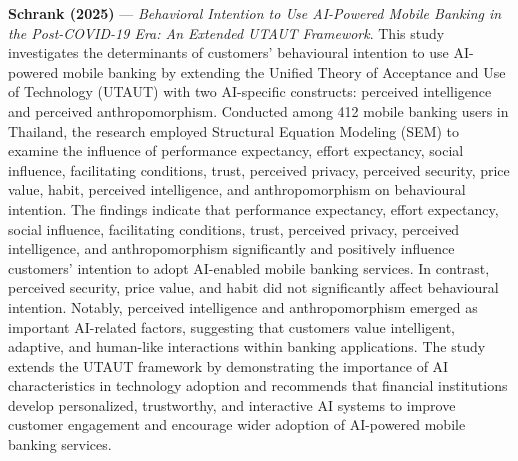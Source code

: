\documentclass[conference]{IEEEtran}
\begin{document}
\noindent\textbf{Schrank (2025)}\nocite{Manta2025} --- \emph{Behavioral Intention to Use AI-Powered Mobile Banking in the Post-COVID-19 Era: An Extended UTAUT Framework}. This study investigates the determinants of customers' behavioural intention to use AI-powered mobile banking by extending the Unified Theory of Acceptance and Use of Technology (UTAUT) with two AI-specific constructs: perceived intelligence and perceived anthropomorphism. Conducted among 412 mobile banking users in Thailand, the research employed Structural Equation Modeling (SEM) to examine the influence of performance expectancy, effort expectancy, social influence, facilitating conditions, trust, perceived privacy, perceived security, price value, habit, perceived intelligence, and anthropomorphism on behavioural intention. The findings indicate that performance expectancy, effort expectancy, social influence, facilitating conditions, trust, perceived privacy, perceived intelligence, and anthropomorphism significantly and positively influence customers' intention to adopt AI-enabled mobile banking services. In contrast, perceived security, price value, and habit did not significantly affect behavioural intention. Notably, perceived intelligence and anthropomorphism emerged as important AI-related factors, suggesting that customers value intelligent, adaptive, and human-like interactions within banking applications. The study extends the UTAUT framework by demonstrating the importance of AI characteristics in technology adoption and recommends that financial institutions develop personalized, trustworthy, and interactive AI systems to improve customer engagement and encourage wider adoption of AI-powered mobile banking services.

\par\medskip
\end{document}
